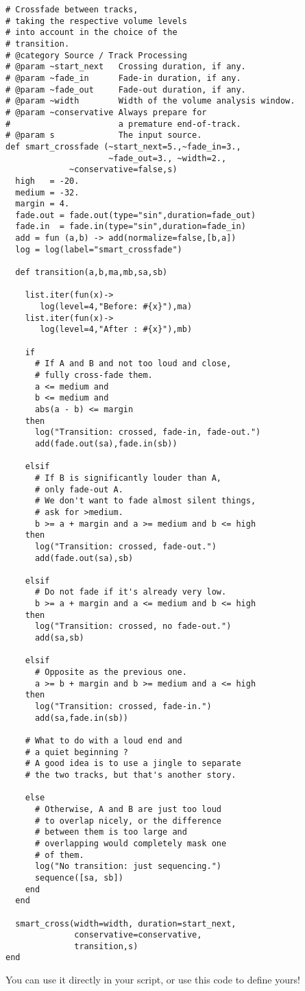 \begin{verbatim}
# Crossfade between tracks, 
# taking the respective volume levels 
# into account in the choice of the 
# transition.
# @category Source / Track Processing
# @param ~start_next   Crossing duration, if any.
# @param ~fade_in      Fade-in duration, if any.
# @param ~fade_out     Fade-out duration, if any.
# @param ~width        Width of the volume analysis window.
# @param ~conservative Always prepare for
#                      a premature end-of-track.
# @param s             The input source.
def smart_crossfade (~start_next=5.,~fade_in=3.,
                     ~fade_out=3., ~width=2.,
		     ~conservative=false,s)
  high   = -20.
  medium = -32.
  margin = 4.
  fade.out = fade.out(type="sin",duration=fade_out)
  fade.in  = fade.in(type="sin",duration=fade_in)
  add = fun (a,b) -> add(normalize=false,[b,a])
  log = log(label="smart_crossfade")

  def transition(a,b,ma,mb,sa,sb)

    list.iter(fun(x)-> 
       log(level=4,"Before: #{x}"),ma)
    list.iter(fun(x)-> 
       log(level=4,"After : #{x}"),mb)

    if
      # If A and B and not too loud and close, 
      # fully cross-fade them.
      a <= medium and 
      b <= medium and 
      abs(a - b) <= margin
    then
      log("Transition: crossed, fade-in, fade-out.")
      add(fade.out(sa),fade.in(sb))

    elsif
      # If B is significantly louder than A, 
      # only fade-out A.
      # We don't want to fade almost silent things, 
      # ask for >medium.
      b >= a + margin and a >= medium and b <= high
    then
      log("Transition: crossed, fade-out.")
      add(fade.out(sa),sb)

    elsif
      # Do not fade if it's already very low.
      b >= a + margin and a <= medium and b <= high
    then
      log("Transition: crossed, no fade-out.")
      add(sa,sb)

    elsif
      # Opposite as the previous one.
      a >= b + margin and b >= medium and a <= high
    then
      log("Transition: crossed, fade-in.")
      add(sa,fade.in(sb))

    # What to do with a loud end and 
    # a quiet beginning ?
    # A good idea is to use a jingle to separate 
    # the two tracks, but that's another story.

    else
      # Otherwise, A and B are just too loud 
      # to overlap nicely, or the difference 
      # between them is too large and 
      # overlapping would completely mask one 
      # of them.
      log("No transition: just sequencing.")
      sequence([sa, sb])
    end
  end

  smart_cross(width=width, duration=start_next, 
              conservative=conservative,
              transition,s)
end
\end{verbatim}
You can use it directly in your script, or use this code to define yours!

